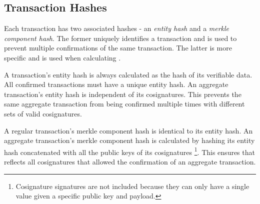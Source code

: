 \subsection{Transaction Hashes}

Each transaction has two associated hashes - an \emph{entity hash} and a \emph{merkle component hash}.
The former uniquely identifies a transaction and is used to prevent multiple confirmations of the same transaction.
The latter is more specific and is used when calculating  .

A transaction's entity hash is always calculated as the hash of its verifiable data.
All confirmed transactions must have a unique entity hash.
An aggregate transaction's entity hash is independent of its cosignatures.
This prevents the same aggregate transaction from being confirmed multiple times with different sets of valid cosignatures.

A regular transaction's merkle component hash is identical to its entity hash.
An aggregate transaction's merkle component hash is calculated by hashing its entity hash concatenated with all the public keys of its cosignatures
\footnote{Cosignature signatures are not included because they can only have a single value given a specific public key and payload.}.
This ensures that  reflects all cosignatures that allowed the confirmation of an aggregate transaction.
